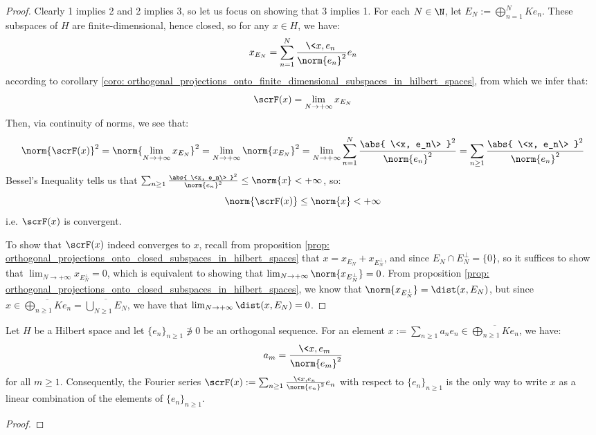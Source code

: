             \begin{proof}
                Clearly 1 implies 2 and 2 implies 3, so let us focus on showing that 3 implies 1. For each $N \in \N$, let $E_N := \bigoplus_{n = 1}^N K e_n$. These subspaces of $H$ are finite-dimensional, hence closed, so for any $x \in H$, we have:
                    $$x_{E_N} = \sum_{n = 1}^N \frac{\<x, e_n\>}{\norm{e_n}^2} e_n$$
                according to corollary \ref{coro: orthogonal_projections_onto_finite_dimensional_subspaces_in_hilbert_spaces}, from which we infer that:
                    $$\scrF(x) = \lim_{N \to +\infty} x_{E_N}$$
                Then, via continuity of norms, we see that:
                    $$\norm{\scrF(x)}^2 = \norm{\lim_{N \to +\infty} x_{E_N}}^2 = \lim_{N \to +\infty} \norm{x_{E_N}}^2 = \lim_{N \to +\infty} \sum_{n = 1}^N \frac{\abs{ \<x, e_n\> }^2}{\norm{e_n}^2} = \sum_{n \geq 1} \frac{\abs{ \<x, e_n\> }^2}{\norm{e_n}^2}$$
                Bessel's Inequality tells us that $\sum_{n \geq 1} \frac{\abs{ \<x, e_n\> }^2}{\norm{e_n}^2} \leq \norm{x} < +\infty$, so:
                    $$\norm{\scrF(x)} \leq \norm{x} < +\infty$$
                i.e. $\scrF(x)$ is convergent.

                To show that $\scrF(x)$ indeed converges to $x$, recall from proposition \ref{prop: orthogonal_projections_onto_closed_subspaces_in_hilbert_spaces} that $x = x_{E_N} + x_{E_N^{\perp}}$, and since $E_N \cap E_N^{\perp} = \{0\}$, so it suffices to show that $\lim_{N \to +\infty} x_{E_N^{\perp}} = 0$, which is equivalent to showing that $\lim_{N \to +\infty} \norm{x_{E_N^{\perp}}} = 0$. From proposition \ref{prop: orthogonal_projections_onto_closed_subspaces_in_hilbert_spaces}, we know that $\norm{x_{E_N^{\perp}}} = \dist(x, E_N)$, but since $x \in \overline{\bigoplus_{n \geq 1} K e_n} = \overline{\bigcup_{N \geq 1} E_N}$, we have that $\lim_{N \to +\infty} \dist(x, E_N) = 0$.
            \end{proof}
        \begin{theorem} \label{theorem: uniqueness_of_fourier_series}
            Let $H$ be a Hilbert space and let $\{e_n\}_{n \geq 1} \not \ni 0$ be an orthogonal sequence. For an element $x := \sum_{n \geq 1} a_n e_n \in \overline{\bigoplus_{n \geq 1} K e_n}$, we have:
                $$a_m = \frac{ \<x, e_m\> }{ \norm{e_m}^2 }$$
            for all $m \geq 1$. Consequently, the Fourier series $\scrF(x) := \sum_{n \geq 1} \frac{\<x, e_n\>}{\norm{e_n}^2} e_n$ with respect to $\{e_n\}_{n \geq 1}$ is the only way to write $x$ as a linear combination of the elements of $\{e_n\}_{n \geq 1}$.
        \end{theorem}
            \begin{proof}
                
            \end{proof}
        
